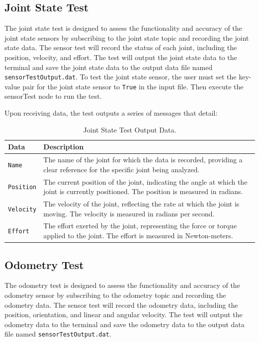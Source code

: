 \documentclass{CSSRforAfrica}
\begin{document}
\subsection{Joint State Test}
The joint state test is designed to assess the functionality and accuracy of the joint state sensors 
by subscribing to the joint state topic and recording the joint state data. The sensor test will record
the status of each joint, including the position, velocity, and effort. The test will output the joint state
data to the terminal and save the joint state data to the output data file named \texttt{sensorTestOutput.dat}.
To test the joint state sensor, the user must set the key-value pair for the joint state sensor to \texttt{True} in the input file. 
Then execute the sensorTest node to run the test.

\newpage

Upon receiving data, the test outputs a series of messages that detail:

\begin{longtable}[c]{|l|p{12cm}|}
    \caption{Joint State Test Output Data.} \label{tab:joint_state_test_output}\\
    \hline
    \rowcolor{gray!30}
    \textbf{Data} & \textbf{Description} \\ \hline
    \endhead %
    \small{\texttt{Name}} & \small{The name of the joint for which the data is recorded, providing a clear reference for the specific joint being analyzed.} \\ \hline
    \small{\texttt{Position}} & \small{The current position of the joint, indicating the angle at which the joint is currently positioned. The position is measured in radians.} \\ \hline
    \small{\texttt{Velocity}} & \small{The velocity of the joint, reflecting the rate at which the joint is moving. The velocity is measured in radians per second.} \\ \hline
    \small{\texttt{Effort}} & \small{The effort exerted by the joint, representing the force or torque applied to the joint. The effort is measured in Newton-meters.} \\ \hline
\end{longtable}

\subsection{Odometry Test}
The odometry test is designed to assess the functionality and accuracy of the odometry sensor by subscribing to the odometry topic and recording the odometry data. 
The sensor test will record the odometry data, including the position, orientation, and linear and angular velocity. The test will output the odometry data to the terminal 
and save the odometry data to the output data file named \texttt{sensorTestOutput.dat}. 
\end{document}
